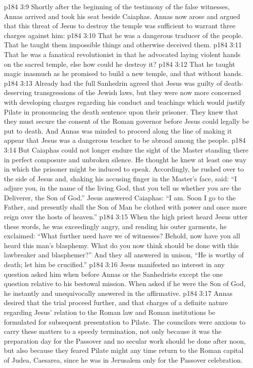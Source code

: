 \vs p184 3:9 Shortly after the beginning of the testimony of the false witnesses, Annas arrived and took his seat beside Caiaphas. Annas now arose and argued that this threat of Jesus to destroy the temple was sufficient to warrant three charges against him:
\pc \vs p184 3:10 \bibnobreakspace That he was a dangerous traducer of the people. That he taught them impossible things and otherwise deceived them.
\vs p184 3:11 \bibnobreakspace That he was a fanatical revolutionist in that he advocated laying violent hands on the sacred temple, else how could he destroy it?
\vs p184 3:12 \bibnobreakspace That he taught magic inasmuch as he promised to build a new temple, and that without hands.
\pc \vs p184 3:13 Already had the full Sanhedrin agreed that Jesus was guilty of death\hyp{}deserving transgressions of the Jewish laws, but they were now more concerned with developing charges regarding his conduct and teachings which would justify Pilate in pronouncing the death sentence upon their prisoner. They knew that they must secure the consent of the Roman governor before Jesus could legally be put to death. And Annas was minded to proceed along the line of making it appear that Jesus was a dangerous teacher to be abroad among the people.
\vs p184 3:14 But Caiaphas could not longer endure the sight of the Master standing there in perfect composure and unbroken silence. He thought he knew at least one way in which the prisoner might be induced to speak. Accordingly, he rushed over to the side of Jesus and, shaking his accusing finger in the Master’s face, said: “I adjure you, in the name of the living God, that you tell us whether you are the Deliverer, the Son of God.” Jesus answered Caiaphas: \textcolor{ubdarkred}{“I am. Soon I go to the Father, and presently shall the Son of Man be clothed with power and once more reign over the hosts of heaven.”}
\vs p184 3:15 When the high priest heard Jesus utter these words, he was exceedingly angry, and rending his outer garments, he exclaimed: “What further need have we of witnesses? Behold, now have you all heard this man’s blasphemy. What do you now think should be done with this lawbreaker and blasphemer?” And they all answered in unison, “He is worthy of death; let him be crucified.”
\vs p184 3:16 Jesus manifested no interest in any question asked him when before Annas or the Sanhedrists except the one question relative to his bestowal mission. When asked if he were the Son of God, he instantly and unequivocally answered in the affirmative.
\vs p184 3:17 Annas desired that the trial proceed further, and that charges of a definite nature regarding Jesus’ relation to the Roman law and Roman institutions be formulated for subsequent presentation to Pilate. The councilors were anxious to carry these matters to a speedy termination, not only because it was the preparation day for the Passover and no secular work should be done after noon, but also because they feared Pilate might any time return to the Roman capital of Judea, Caesarea, since he was in Jerusalem only for the Passover celebration.
